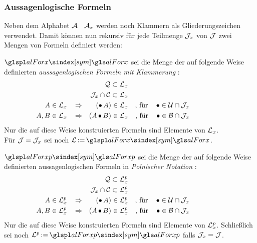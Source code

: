 \subsubsection{Aussagenlogische Formeln}%
\label{subsub:Formeln}

Neben dem Alphabet $\mathcal{A}$ \textbzw\ $\mathcal{A}_x$ werden noch Klammern als Gliederungszeichen verwendet.
Damit können nun rekursiv für jede Teilmenge $\mathcal{J}_x$ von $\mathcal{J}$ zwei Mengen von Formeln definiert werden:

$\glsSym{alForx}$ sei die Menge der auf folgende Weise definierten \emph{aussagenlogischen Formeln mit Klammerung}%
:
\begin{align}
	&                                 & \mathcal{Q}              \subset \mathcal{L}_x
	\\
	&                                 & \mathcal{J}_x \cap \mathcal{C} \subset \mathcal{L}_x
	\\
	A    \in \mathcal{L}_x & \quad \operatorname{\Rightarrow} &  (\operatorname{\bullet} A)         \in     \mathcal{L}_x
	& & \text{, für} \quad \operatorname{\bullet} \in \mathcal{U} \cap \mathcal{J}_x
	\\
	A, B \in \mathcal{L}_x & \quad \operatorname{\Rightarrow} & (A \operatorname{\bullet} B)        \in     \mathcal{L}_x
	& & \text{, für} \quad \operatorname{\bullet} \in \mathcal{B} \cap \mathcal{J}_x
	&&&&&&&&&&
\end{align}
Nur die auf diese Weise konstruierten Formeln sind Elemente von $\mathcal{L}_x$.
\\Für $\mathcal{J} = \mathcal{J}_x$ sei noch $\alFor \defeq \glsSym{alForx}$.

$\glsSym{alForxp}$ sei die Menge der auf folgende Weise definierten aussagenlogischen Formeln in \emph{Polnischer Notation}%
:
\begin{align}
	&                                  & \mathcal{Q}              \subset \mathcal{L}_x^p
	\\
	&                                  & \mathcal{J}_x \cap \mathcal{C} \subset \mathcal{L}_x^p
	\\
	A    \in \mathcal{L}_x^p & \quad \operatorname{\Rightarrow} &  (\operatorname{\bullet} A)         \in     \mathcal{L}_x^p
	& & \text{, für}  \quad \operatorname{\bullet} \in \mathcal{U} \cap \mathcal{J}_x
	\\
	A, B \in \mathcal{L}_x^p & \quad \operatorname{\Rightarrow} & (A \operatorname{\bullet} B)        \in     \mathcal{L}_x^p
	& & \text{, für}  \quad \operatorname{\bullet} \in \mathcal{B} \cap \mathcal{J}_x
	&&&&&&&&&&
\end{align}
Nur die auf diese Weise konstruierten Formeln sind Elemente von $\mathcal{L}_x^p$.
Schließlich sei noch $\alForp \defeq \glsSym{alForxp}$ falls $\mathcal{J}_x = \mathcal{J}$.

